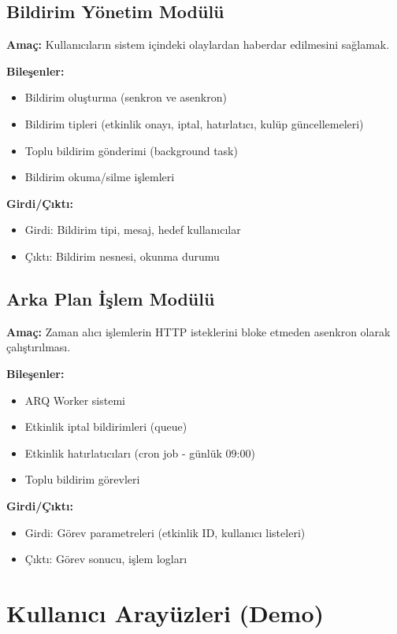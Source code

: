 \documentclass[a4paper,12pt]{report}
\begin{document}
\subsection{Bildirim Yönetim Modülü}

\textbf{Amaç:} Kullanıcıların sistem içindeki olaylardan haberdar edilmesini sağlamak.

\textbf{Bileşenler:}
\begin{itemize}
    \item Bildirim oluşturma (senkron ve asenkron)
    \item Bildirim tipleri (etkinlik onayı, iptal, hatırlatıcı, kulüp güncellemeleri)
    \item Toplu bildirim gönderimi (background task)
    \item Bildirim okuma/silme işlemleri
\end{itemize}

\textbf{Girdi/Çıktı:}
\begin{itemize}
    \item Girdi: Bildirim tipi, mesaj, hedef kullanıcılar
    \item Çıktı: Bildirim nesnesi, okunma durumu
\end{itemize}

\subsection{Arka Plan İşlem Modülü}

\textbf{Amaç:} Zaman alıcı işlemlerin HTTP isteklerini bloke etmeden asenkron olarak çalıştırılması.

\textbf{Bileşenler:}
\begin{itemize}
    \item ARQ Worker sistemi
    \item Etkinlik iptal bildirimleri (queue)
    \item Etkinlik hatırlatıcıları (cron job - günlük 09:00)
    \item Toplu bildirim görevleri
\end{itemize}

\textbf{Girdi/Çıktı:}
\begin{itemize}
    \item Girdi: Görev parametreleri (etkinlik ID, kullanıcı listeleri)
    \item Çıktı: Görev sonucu, işlem logları
\end{itemize}

\section{Kullanıcı Arayüzleri (Demo)}
\end{document}
